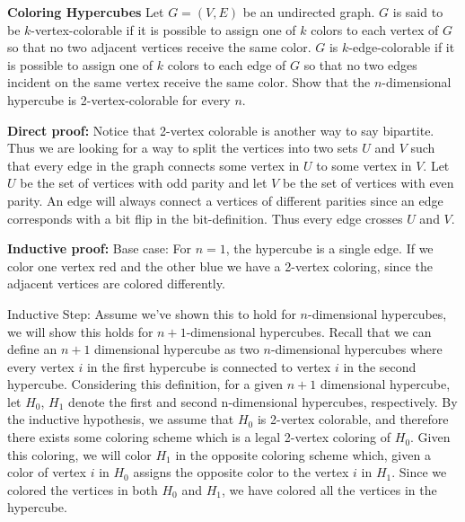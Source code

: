 \question \textbf{Coloring Hypercubes} \newline Let $G = (V, E)$ be 
an undirected graph. $G$ is said to be $k$-vertex-colorable if it is 
possible to assign one of $k$ colors to each vertex of $G$ so that no 
two adjacent vertices receive the same color. $G$ is $k$-edge-colorable 
if it is possible to assign one of $k$ colors to each edge of $G$ so 
that no two edges incident on the same vertex receive the same color. \newline
Show that the $n$-dimensional hypercube is 2-vertex-colorable for 
every $n$.
\begin{solution}[3in] 

\textbf{Direct proof:}
Notice that 2-vertex colorable is another way to say bipartite. Thus we are looking for a way to split the vertices into two sets $U$ and $V$ such that every edge in the graph connects some vertex in $U$ to some vertex in $V$. Let $U$ be the set of vertices with odd parity and let $V$ be the set of vertices with even parity. An edge will always connect a vertices of different parities since an edge corresponds with a bit flip in the bit-definition. Thus every edge crosses $U$ and $V$.\newline

\textbf{Inductive proof:}
Base case: For $n = 1$, the hypercube is a single edge. If we color 
one vertex red and the other blue we have a 2-vertex coloring, since 
the adjacent vertices are colored differently. 

Inductive Step: Assume we’ve shown this to hold for $n$-dimensional 
hypercubes, we will show this holds for $n + 1$-dimensional hypercubes. 
Recall that we can define an $n + 1$ dimensional hypercube as two 
$n$-dimensional hypercubes where every vertex $i$ in the first 
hypercube is connected to vertex $i$ in the second hypercube. 
Considering this definition, for a given $n + 1$ dimensional 
hypercube, let $H_0$, $H_1$ denote the first and second n-dimensional 
hypercubes, respectively. By the inductive hypothesis, we assume that 
$H_0$ is 2-vertex colorable, and therefore there exists some coloring 
scheme which is a legal 2-vertex coloring of $H_0$. Given this coloring, 
we will color $H_1$ in the opposite coloring scheme which, given a color 
of vertex $ i$ in $H_0$ assigns the opposite color to the vertex $i$ in 
$H_1$. Since we colored the vertices in both $H_0$ and $H_1$, we have 
colored all the vertices in the hypercube. 


\end{solution}
